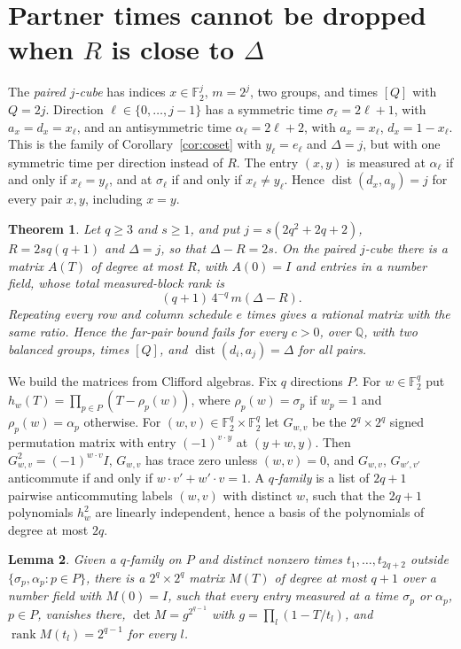 \documentclass[11pt]{article}
\newtheorem{theorem}{Theorem}
\newtheorem{lemma}[theorem]{Lemma}
\newcommand{\F}{\mathbb F}
\newcommand{\rank}{\operatorname{rank}}
\newcommand{\dist}{\operatorname{dist}}
\begin{document}
\section{Partner times cannot be dropped when $R$ is close to $\Delta$}
The \emph{paired $j$-cube} has indices $x\in\F_2^j$, $m=2^j$, two groups, and times $[Q]$ with $Q=2j$. Direction $\ell\in\{0,\dots,j-1\}$ has a symmetric time $\sigma_\ell=2\ell+1$, with $a_x=d_x=x_\ell$, and an antisymmetric time $\alpha_\ell=2\ell+2$, with $a_x=x_\ell$, $d_x=1-x_\ell$. This is the family of Corollary~\ref{cor:coset} with $y_\ell=e_\ell$ and $\Delta=j$, but with one symmetric time per direction instead of $R$. The entry $(x,y)$ is measured at $\alpha_\ell$ if and only if $x_\ell=y_\ell$, and at $\sigma_\ell$ if and only if $x_\ell\ne y_\ell$. Hence $\dist(d_x,a_y)=j$ for every pair $x,y$, including $x=y$.
\begin{theorem}\label{thm:far}
Let $q\ge3$ and $s\ge1$, and put $j=s(2q^2+2q+2)$, $R=2sq(q+1)$ and $\Delta=j$, so that $\Delta-R=2s$. On the paired $j$-cube there is a matrix $A(T)$ of degree at most $R$, with $A(0)=I$ and entries in a number field, whose total measured-block rank is
\[(q+1)\,4^{-q}\,m(\Delta-R).\]
Repeating every row and column schedule $e$ times gives a rational matrix with the same ratio. Hence the far-pair bound fails for every $c>0$, over $\mathbb Q$, with two balanced groups, times $[Q]$, and $\dist(d_i,a_j)=\Delta$ for all pairs.
\end{theorem}
We build the matrices from Clifford algebras. Fix $q$ directions $P$. For $w\in\F_2^q$ put $h_w(T)=\prod_{p\in P}(T-\rho_p(w))$, where $\rho_p(w)=\sigma_p$ if $w_p=1$ and $\rho_p(w)=\alpha_p$ otherwise. For $(w,v)\in\F_2^q\times\F_2^q$ let $G_{w,v}$ be the $2^q\times2^q$ signed permutation matrix with entry $(-1)^{v\cdot y}$ at $(y+w,y)$. Then $G_{w,v}^2=(-1)^{w\cdot v}I$, $G_{w,v}$ has trace zero unless $(w,v)=0$, and $G_{w,v}$, $G_{w',v'}$ anticommute if and only if $w\cdot v'+w'\cdot v=1$. A \emph{$q$-family} is a list of $2q+1$ pairwise anticommuting labels $(w,v)$ with distinct $w$, such that the $2q+1$ polynomials $h_w^2$ are linearly independent, hence a basis of the polynomials of degree at most $2q$.
\begin{lemma}\label{lem:cluster}
Given a $q$-family on $P$ and distinct nonzero times $t_1,\dots,t_{2q+2}$ outside $\{\sigma_p,\alpha_p:p\in P\}$, there is a $2^q\times2^q$ matrix $M(T)$ of degree at most $q+1$ over a number field with $M(0)=I$, such that every entry measured at a time $\sigma_p$ or $\alpha_p$, $p\in P$, vanishes there, $\det M=g^{2^{q-1}}$ with $g=\prod_l(1-T/t_l)$, and $\rank M(t_l)=2^{q-1}$ for every $l$.
\end{lemma}
\end{document}
